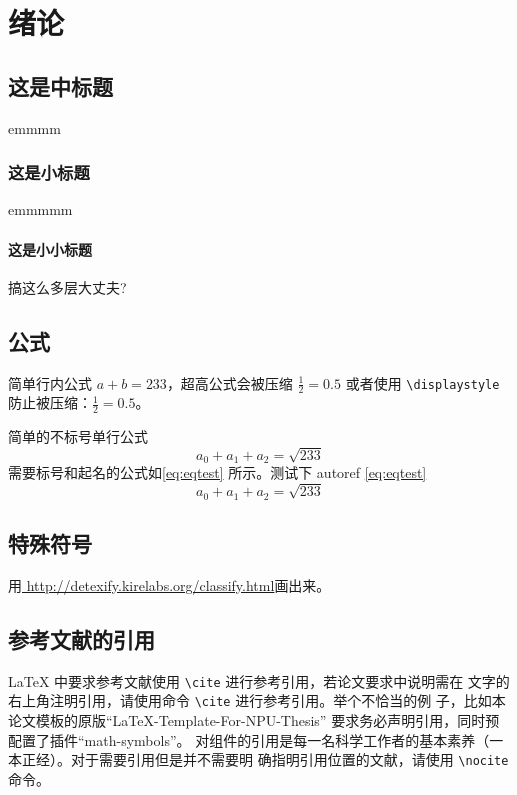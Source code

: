 \documentclass[lang=chs, degree=phd, blindreview=false, winfonts=true]{ya-npu/yanputhesis}
\theoremstyle{plain}%
\theoremstyle{remark}%
\begin{document}
\chapter{绪论}
\section{这是中标题}
emmmm
\subsection{这是小标题}
emmmmm
\subsubsection{这是小小标题}
搞这么多层大丈夫?

\section{公式}
简单行内公式 $a+b=233$，超高公式会被压缩 $\frac{1}{2}=0.5$ 或者使用
\lstinline`\displaystyle` 防止被压缩：$\displaystyle \frac{1}{2}=0.5$。

简单的不标号单行公式
$$a_0+a_1+a_2=\sqrt{233}$$
需要标号和起名的公式如\autoref{eq:eqtest} 所示。测试下 autoref \autoref{eq:eqtest}
\begin{equation}
    \label{eq:eqtest}
    a_0 + a_1 + a_2 = \sqrt{233}
\end{equation}

\section{特殊符号}

用\href{http://detexify.kirelabs.org/classify.html}{
    http://detexify.kirelabs.org/classify.html}画出来。

\section{参考文献的引用}

\LaTeX{} 中要求参考文献使用 \lstinline`\cite` 进行参考引用，若论文要求中说明需在
文字的右上角注明引用，请使用命令 \lstinline`\cite` 进行参考引用。举个不恰当的例
子，比如本论文模板的原版“LaTeX-Template-For-NPU-Thesis”\cite{NWPUThesisLaTeXTemplate}
要求务必声明引用，同时预配置了插件“math-symbols”\cite{MathSymbolsinLaTeXbypolossk}。
对组件的引用是每一名科学工作者的基本素养（一本正经）。对于需要引用但是并不需要明
确指明引用位置的文献，请使用 \lstinline`\nocite` 命令。
\end{document}
